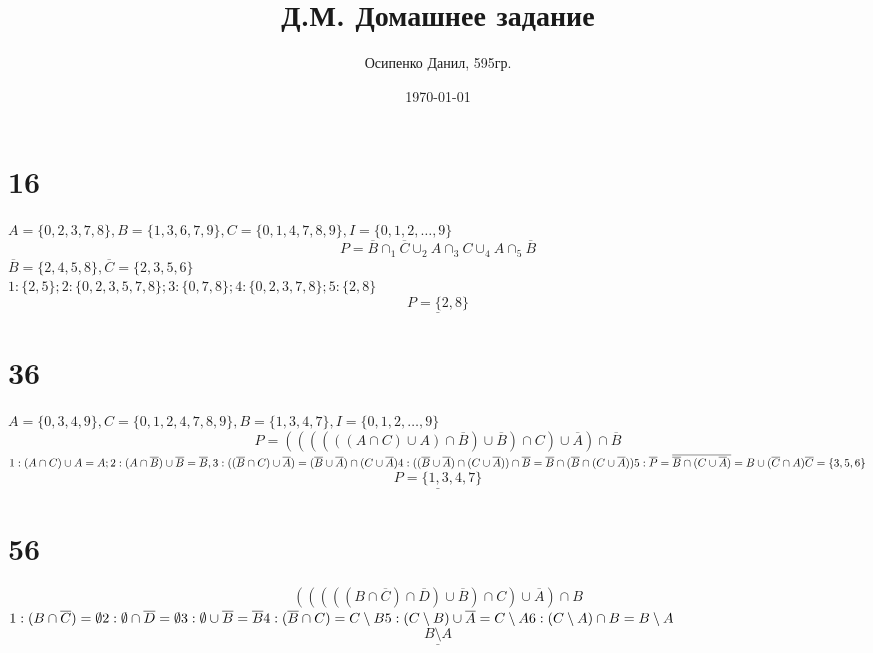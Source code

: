 \documentclass[a4paper, 12pt]{article}
\title{Д.М. Домашнее задание}
\author{Осипенко Данил, 595гр.}
\date{\today}
\begin{document}
\sffamily
\maketitle

\section*{16}
$ A = \{0,2,3,7,8\}, B = \{1,3,6,7,9\}, C = \{0,1,4,7,8,9\}, I = \{0,1,2,\ldots,9\} $
\[
    P = \overline{B}\cap_1\overline{C}\cup_2 A\cap_3 C \cup_4 A \cap_5 \overline{B}     
\]
$ \overline{B} = \{2,4,5,8\},\overline{C} = \{2,3,5,6\} $\\
$ 1: \{2,5\};2:\{0,2,3,5,7,8\};3:\{0,7,8\};4: \{0,2,3,7,8\};5:\{2,8\} $
\[
       \underline{P = \{2,8\}}
\]
\section*{36}
$ A = \{0,3,4,9\},C = \{0,1,2,4,7,8,9\}, B = \{1,3,4,7\}, I = \{0,1,2,\ldots,9\}$
\[
       P = ((((((A\cap C)\cup A) \cap \overline{B}) \cup \overline{B}) \cap C) \cup 
       \overline{A}) \cap \overline{B}
\]
$ 1: (A\cap C)\cup A = A ;\\
2:(A \cap \overline{B}) \cup \overline{B} = \overline{B},\\
3:((\overline{B} \cap C) \cup \overline{A}) = (\overline{B} \cup \overline{A})\cap (C \cup \overline{A})\\
4:((\overline{B} \cup \overline{A})\cap (C \cup \overline{A}))\cap \overline{B} = \overline{B} \cap (\overline{B}\cap(C\cup \overline{A}))\\
5:\overline{P} = \overline{\overline{B}\cap(C\cup \overline{A})} = B \cup (\overline{C} \cap A)\\
\overline{C} = \{3,5,6\}$
\[
       \underline{P = \{1,3,4,7\}}
\]
\newpage
\section*{56}
\[
       (((((B\cap \overline{C})\cap \overline{D}) \cup \overline{B}) \cap C) \cup \overline{A}) \cap B
\]
$1: (B\cap \overline{C}) = \emptyset\\
2: \emptyset \cap \overline{D} = \emptyset\\
3: \emptyset \cup \overline{B} = \overline{B}\\
4: (\overline{B} \cap C) = C \setminus B\\
5: (C \setminus B)\cup \overline{A} = C\setminus A\\
6: (C\setminus A) \cap B = B \setminus A $
\[
       \underline{B \setminus A}
\]
\end{document}
